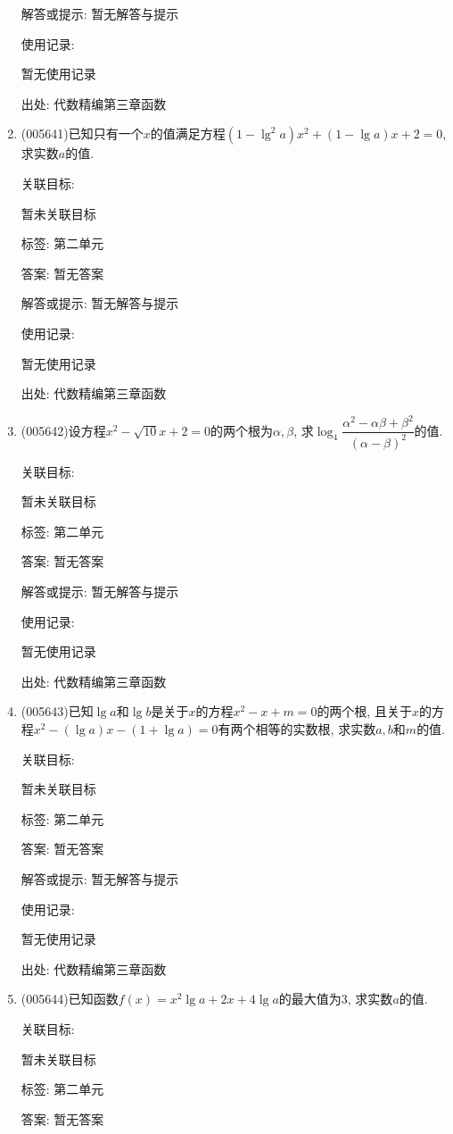 \documentclass[10pt,a4paper]{article}
\begin{document}
\begin{enumerate}[1.]
解答或提示: 暂无解答与提示

使用记录:

暂无使用记录


出处: 代数精编第三章函数
\item { (005641)}已知只有一个$x$的值满足方程$(1-\lg ^2a)x^2+(1-\lg a)x+2=0$, 求实数$a$的值.


关联目标:

暂未关联目标



标签: 第二单元

答案: 暂无答案

解答或提示: 暂无解答与提示

使用记录:

暂无使用记录


出处: 代数精编第三章函数
\item { (005642)}设方程$x^2-\sqrt {10}x+2=0$的两个根为$\alpha ,\beta$, 求$\log_4\dfrac{\alpha ^2-\alpha \beta +\beta ^2}{(\alpha -\beta)^2}$的值.


关联目标:

暂未关联目标



标签: 第二单元

答案: 暂无答案

解答或提示: 暂无解答与提示

使用记录:

暂无使用记录


出处: 代数精编第三章函数
\item { (005643)}已知$\lg a$和$\lg b$是关于$x$的方程$x^2-x+m=0$的两个根, 且关于$x$的方程$x^2-(\lg a)x-(1+\lg a)=0$有两个相等的实数根, 求实数$a,b$和$m$的值.


关联目标:

暂未关联目标



标签: 第二单元

答案: 暂无答案

解答或提示: 暂无解答与提示

使用记录:

暂无使用记录


出处: 代数精编第三章函数
\item { (005644)}已知函数$f(x)=x^2\lg a+2x+4\lg a$的最大值为3, 求实数$a$的值.


关联目标:

暂未关联目标



标签: 第二单元

答案: 暂无答案


\end{enumerate}
\end{document}
